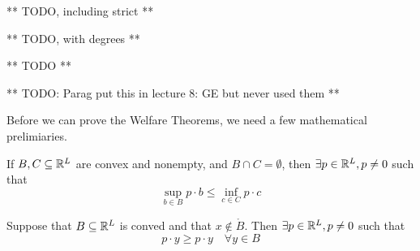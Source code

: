 \begin{definition}
  ** TODO, including strict **
\end{definition}

\begin{definition}
  ** TODO, with degrees **
\end{definition}

\begin{definition}[Homothetic]
  ** TODO **
\end{definition}


** TODO: Parag put this in lecture 8: GE but never used them **

Before we can prove the Welfare Theorems, we need a few mathematical
prelimiaries.

\begin{theorem}
  If $B, C \subseteq {\mathbb R}^L$ are convex and nonempty, and $B \cap C =
  \emptyset$, then $\exists p \in {\mathbb R}^L, p \neq 0$ such that
  \[
  \sup_{b \in B} p \cdot b \leq \inf_{c \in C} p \cdot c
  \]
\end{theorem}

\begin{theorem}
  Suppose that $B \subseteq {\mathbb R}^L$ is conved and that $x \not\in
  \mathring B$. Then $\exists p \in {\mathbb R}^L, p \neq 0$ such that 
  \[
  p \cdot y \geq p \cdot y \quad \forall y \in B
  \]
\end{theorem}


